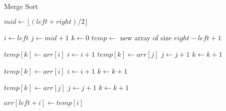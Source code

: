 \documentclass{article}
\begin{document}
\begin{algorithm}
\caption{Merge Sort}
\begin{algorithmic}[1]
        \State $mid \gets \lfloor(left + right) / 2\rfloor$
        \State {}
        \State {}
        \State {}
    \EndIf
\EndProcedure

    \State $i \gets left$
    \State $j \gets mid + 1$
    \State $k \gets 0$
    \State $temp \gets$ new array of size $right - left + 1$

            \State $temp[k] \gets arr[i]$
            \State $i \gets i + 1$
        \Else
            \State $temp[k] \gets arr[j]$
            \State $j \gets j + 1$
        \EndIf
        \State $k \gets k + 1$
    \EndWhile

        \State $temp[k] \gets arr[i]$
        \State $i \gets i + 1$
        \State $k \gets k + 1$
    \EndWhile

        \State $temp[k] \gets arr[j]$
        \State $j \gets j + 1$
        \State $k \gets k + 1$
    \EndWhile

        \State $arr[left + i] \gets temp[i]$
    \EndFor
\EndProcedure
\end{algorithmic}
\end{algorithm}
\end{document}
